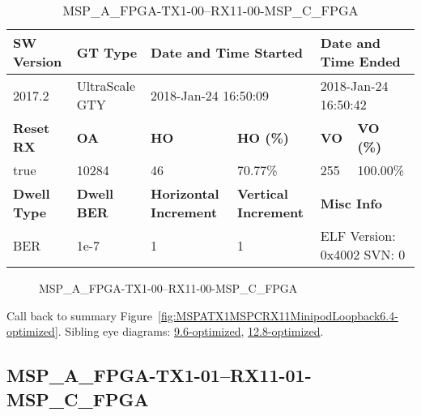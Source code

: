 \begin{table}[h]
\centering
\caption{MSP\_A\_FPGA-TX1-00--RX11-00-MSP\_C\_FPGA}
\label{tab:MSPAFPGATX100RX1100MSPCFPGA6.4-optimized}
\begin{tabular}{@{}|l|l|l|l|l|l|@{}}
\toprule
\textbf{SW Version}                & \textbf{GT Type}   & \multicolumn{2}{l|}{\textbf{Date and Time Started}}            & \multicolumn{2}{l|}{\textbf{Date and Time Ended}}        \\ \midrule
2017.2                       & UltraScale GTY          & \multicolumn{2}{l|}{2018-Jan-24 16:50:09}                   & \multicolumn{2}{l|}{2018-Jan-24 16:50:42}               \\ \midrule
\textbf{Reset RX}                  & \textbf{OA} & \textbf{HO}   & \textbf{HO (\%)} & \textbf{VO} & \textbf{VO (\%)} \\ \midrule
true & 10284        & 46          & 70.77\%        & 255        & 100.00\%       \\ \midrule
\textbf{Dwell Type}                & \textbf{Dwell BER} & \textbf{Horizontal Increment} & \textbf{Vertical Increment}    & \multicolumn{2}{l|}{\textbf{Misc Info}}                  \\ \midrule
BER                            & 1e-7        & 1        & 1           & \multicolumn{2}{l|}{ELF Version: 0x4002 SVN: 0}                         \\ \bottomrule
\end{tabular}
\end{table}

\begin{figure}[h]
\caption{MSP\_A\_FPGA-TX1-00--RX11-00-MSP\_C\_FPGA} \label{fig:MSPAFPGATX100RX1100MSPCFPGA6.4-optimized}
\end{figure}

Call back to summary Figure~\ref{fig:MSPATX1MSPCRX11MinipodLoopback6.4-optimized}.
Sibling eye diagrams: \hyperref[sec:MSPAFPGATX100RX1100MSPCFPGA9.6-optimized]{9.6-optimized}, \hyperref[sec:MSPAFPGATX100RX1100MSPCFPGA12.8-optimized]{12.8-optimized}.

\clearpage
\newpage


\subsection{MSP\_A\_FPGA-TX1-01--RX11-01-MSP\_C\_FPGA}\label{sec:MSPAFPGATX101RX1101MSPCFPGA6.4-optimized}

